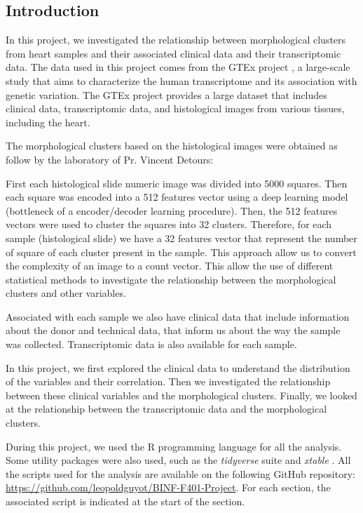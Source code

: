 \documentclass[a4paper, 11pt]{article}
\begin{document}
\begin{multicols}{2}

\section*{Introduction}

In this project, we investigated the relationship between morphological clusters from heart samples and their associated clinical data and their transcriptomic data.
The data used in this project comes from the GTEx project \citep{lonsdale2013genotype}, a large-scale study that aims to characterize the human transcriptome and its association with genetic variation.
The GTEx project provides a large dataset that includes clinical data, transcriptomic data, and histological images from various tissues, including the heart.


The morphological clusters based on the histological images were obtained as follow by the laboratory of Pr. Vincent Detours: 

First each histological slide numeric image was divided into 5000 squares.
Then each square was encoded into a 512 features vector using a deep learning model (bottleneck of a encoder/decoder learning procedure). 
Then, the 512 features vectors were used to cluster the squares into 32 clusters.
Therefore, for each sample (histological slide) we have a 32 features vector that represent the number of square of each cluster present in the sample.
This approach allow us to convert the complexity of an image to a count vector. 
This allow the use of different statistical methods to investigate the relationship between the morphological clusters and other variables.

Associated with each sample we also have clinical data that include information about the donor and technical data, that inform us about the way the sample was collected.
Transcriptomic data is also available for each sample. 

In this project, we first explored the clinical data to understand the distribution of the variables and their correlation.
Then we investigated the relationship between these clinical variables and the morphological clusters.
Finally, we looked at the relationship between the transcriptomic data and the morphological clusters.

During this project, we used the R programming language \citep{R:2024} for all the analysis. Some utility packages were also used, such as the \textit{tidyverse} suite \citep{tidyverse} and \textit{xtable} \citep{xtable}.
All the scripts used for the analysis are available on the following GitHub repository: \url{https://github.com/leopoldguyot/BINF-F401-Project}.
For each section, the associated script is indicated at the start of the section.


\end{multicols}
\end{document}
